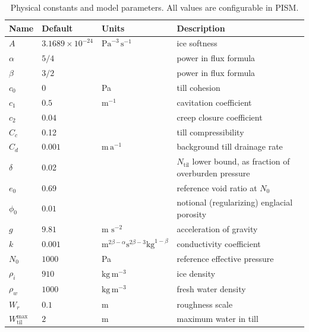 \documentclass[gmd]{copernicus}   %
\newcommand{\text}{\textrm}
\newcommand{\Ntil}{N_{\text{til}}}
\newcommand{\Wtilmax}{W_{\text{til}}^{\text{max}}}
\providecommand{\DIFadd}[1]{{\protect\color{blue}\uwave{#1}}} %
\providecommand{\DIFaddFL}[1]{\DIFadd{#1}} %
\providecommand{\DIFaddbeginFL}{} %
\providecommand{\DIFaddendFL}{} %
\begin{document}
\begin{table}[ht]
  \centering
  \caption{Physical constants and model parameters.  All values are configurable in PISM\DIFaddbeginFL \DIFaddFL{; see Table \ref{tab:correspondence}}\DIFaddendFL .}
  \begin{tabular}{lllp{3.0in}} 
    \textbf{Name} & \textbf{Default} & \textbf{Units} & \textbf{Description}\\
\hline
    $A$ & $3.1689\times 10^{-24}$ & $\text{Pa}^{-3}\,\text{s}^{-1}$ & ice softness \citep{EISMINT96} \phantom{$\Big|$} \\
    $\alpha$ & $5/4$ & & power in flux formula  \citep{Schoofetal2012} \\
    $\beta$ & $3/2$ & & power in flux formula  \citep{Schoofetal2012} \\
    $c_0$ & 0 & Pa & till cohesion \citep{Tulaczyketal2000} \\
    $c_1$ & $0.5$ & $\text{m}^{-1}$ & cavitation coefficient \citep{Schoofetal2012} \\
    $c_2$ & $0.04$ & & creep closure coefficient \\
    $C_c$ & 0.12 &  & till compressibility \citep{Tulaczyketal2000} \\
    $C_d$ & $0.001$ &  $\text{m}\,\text{a}^{-1}$ & background till drainage rate \\
    $\delta$ & 0.02 &  & $\Ntil$ lower bound, as fraction of overburden pressure \\
    $e_0$ & 0.69 &  & reference void ratio at $N_0$ \citep{Tulaczyketal2000} \\
    $\phi_0$ & $0.01$ & & notional (regularizing) englacial porosity \\
    $g$ & $9.81$ & m $\text{s}^{-2}$ & acceleration of gravity \\
    $k$ & $0.001$ & $\text{m}^{2\beta-\alpha} \text{s}^{2\beta-3} \text{kg}^{1-\beta}$ & conductivity coefficient \citep{Schoofetal2012} \\
    $N_0$ & $1000$ & Pa & reference effective pressure \citep{Tulaczyketal2000} \\
    $\rho_i$ & $910$ & $\text{kg}\,\text{m}^{-3}$ & ice density \citep{GreveBlatter2009} \\
    $\rho_w$ & $1000$ & $\text{kg}\,\text{m}^{-3}$ & fresh water density \citep{GreveBlatter2009} \\
    $W_r$ & $0.1$ & $\text{m}$ & roughness scale \citep{Hewittetal2012} \\
    $\Wtilmax$ & $2\phantom{\Big|}$ & $\text{m}$ & maximum water in till \citep{BBssasliding} \\
    \hline
  \end{tabular}
 \label{tab:constants}
\end{table}
\end{document}
